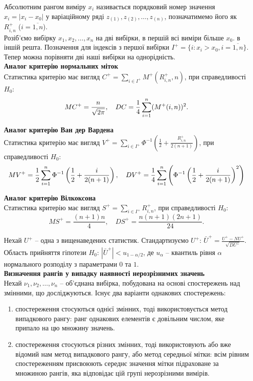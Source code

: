 Абсолютним рангом виміру $x_i$ називається порядковий номер значення $x_i = |x_i - x_0|$ у варіаційному ряді $z_{(1)}, z_{(2)}, \ldots, z_{(n)}$, позначатимемо його як $R_{i,n}^+$ ($i=\overline{1,n}$). \\

Розіб'ємо вибірку $x_1, x_2, \ldots, x_n$ на дві вибірки, в першій всі виміри більше $x_0$. в іншій решта. Позначення для індексів з першої вибірки $I^+ = \{ i : x_i > x_0, i = \overline{1,n} \}$. Тепер можна порівняти дві наші вибірки на однорідність. \\

\textbf{Аналог критерію нормальних міток} \\

Статистика критерію має вигляд $C^+ = \sum_{i \in I^+} M^+(R_{i,n}^+, n)$, при справедливості $H_0$: \[ MC^+ = \dfrac{n}{\sqrt{2\pi}}, \quad DC = \dfrac{1}{4} \displaystyle\sum\limits_{i=1}^n (M^+(i, n))^2. \]

\textbf{Аналог критерію Ван дер Вардена} \\

Статистика критерію має вигляд $V^+ = \sum_{i \in I^+} \Phi^{-1} \left( \frac{1}{2} + \frac{R_{i,n}^+}{2(n + 1)} \right)$, при справедливості $H_0$: \[ MV^+ = \dfrac{1}{2} \displaystyle\sum\limits_{i=1}^n \Phi^{-1} \left( \dfrac{1}{2} + \dfrac{i}{2(n + 1)} \right), \quad DV^+ = \dfrac{1}{4} \displaystyle\sum\limits_{i=1}^n \left( \Phi^{-1} \left( \dfrac{1}{2} + \dfrac{i}{2(n + 1)} \right)^2 \right) \]

\textbf{Аналог критерію Вілкоксона} \\

Статистика критерію має вигляд  $S^+ = \sum_{i\in I^+} R_{i, n}^+$, при справедливості $H_0$: \[ MS^+ = \dfrac{(n+1)n}{4}, \quad DS^+ = \dfrac{n(n+1)(2n+1)}{24}. \]

Нехай $U^+$ -- одна з вищенаведених статистик. Стандартизуємо $U^+$: $\bar{U}^+ = \frac{U^+ - NU^+}{\sqrt{DU^+}}$. Область прийняття гіпотези $H_0$: $|\bar{U}^+| < u_{1 - \alpha / 2}$, де $u_\alpha$ -- квантиль рівня $\alpha$ нормального розподілу з параметрами $0$ та $1$. \\

\textbf{Визначення рангів у випадку наявності нерозрізнимих значень} \\

Нехай $\nu_1, \nu_2, \ldots, \nu_n$ -- об'єднана вибірка, побудована на основі спостережень над змінними, що досліджуються. Існує два варіанти однакових спостережень:
\begin{enumerate}
    \item спостереження стосуються однієї змінних, тоді використовується метод випадкового рангу: ранг однакових елементів є довільним числом, яке припало на цю множину значень.
    
    \item спостереження стосуються різних змінних, тоді використовують або вже відомий нам метод випадкового рангу, або метод середньої мітки: всім рівним спостереженням присвоюють середнє значення мітки підраховане за множиною рангів, яка відповідає цій групі нерозрізними вимірів.
\end{enumerate}

